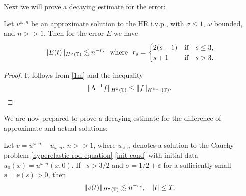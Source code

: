 %
%
%
Next we will prove a decaying estimate for the error:
%
%
%
%
%                      
%
%
%
%
\begin{lemma}
\label{lem:error_of_approx_solution}
Let $u^{\omega,n}$ be an approximate solution to the HR i.v.p., with 
$\sigma \le 1$,  $\omega$ bounded, and $n >> 1$.
Then for the error $E$ we have
%
%
\begin{equation}
\label{total-error-approx-solution}
\begin{split}
\|E(t)\|_{H^\sigma(\mathbb{T})} \lesssim n^{-r_s} \ \ \text{where} \ \ r_s = 
\begin{cases}
2(s-1)   & \text{if} \quad s \le 3,\\  s+1  & \text{if} \quad s > 3. \\
\end{cases}
\end{split}
\end{equation}
%
%
%
%
\end{lemma}
%
%
%
%
%
%
%
\begin{proof} It follows from \eqref{1m} and the inequality
%
%
%
%
\begin{equation*}
\begin{split}
\|\Lambda^{-1}f \|_{H^{k}(\mathbb{T})} \le
\|f\|_{H^{k-1}(\mathbb{T})}.
\end{split}
\end{equation*}
\end{proof}
%
%
%
%
%
%
%
%
%
%
We are now prepared to prove a decaying estimate for the difference of 
approximate and actual solutions:
%
%
\begin{proposition}
\label{prop:bound_for_difference-of-approx-actual-soln}
Let $v=u^{\omega,n} - u_{\omega,n}$, $n >>1$,
where $u_{\omega,n}$ denotes a solution to
the Cauchy-problem \eqref{hyperelastic-rod-equation}-\eqref{init-cond} with
initial data $u_0(x) = u^{\omega,n}(x,0)$.
If \ $s > 3/2 $ and $\sigma = 1/2 + \ee$ for a sufficiently
small $\ee = \ee(s) > 0$, then 
%
%
\begin{equation} \label{differ-Hsigma-est} \|
v(t)
\|_{H^\sigma(\mathbb{T})}
\lesssim n^{-r_s}, \quad |t| \le T.
\end{equation}
%
%
\end{proposition}
%
%

